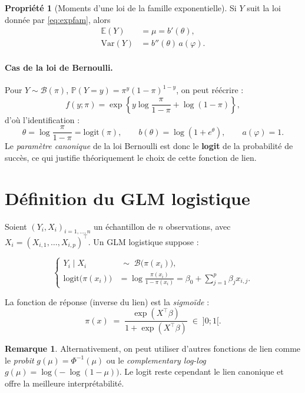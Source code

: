\documentclass[11pt,a4paper,twoside]{report}
\newcommand{\logit}{\mathrm{logit}}
\newcommand{\E}{\mathbb{E}}
\newcommand{\Var}{\mathrm{Var}}
\newcommand{\Prob}{\mathbb{P}}
\theoremstyle{definition}
\newtheorem{remarque}{Remarque}[chapter]
\newtheorem{propriete}{Propriété}[chapter]
\begin{document}
\begin{propriete}[Moments d'une loi de la famille exponentielle]
Si $Y$ suit la loi donnée par \eqref{eq:expfam}, alors
\begin{align}
  \E(Y)  &= \mu = b'(\theta), \\
  \Var(Y) &= b''(\theta)\, a(\varphi).
\end{align}
\end{propriete}

\paragraph{Cas de la loi de Bernoulli.}
Pour $Y \sim \mathcal{B}(\pi)$, $\Prob(Y=y) = \pi^y(1-\pi)^{1-y}$, on peut
réécrire :
\[
  f(y;\pi) = \exp\!\left\{ y\log\!\frac{\pi}{1-\pi} + \log(1-\pi)\right\},
\]
d'où l'identification :
\[
  \theta = \log\!\frac{\pi}{1-\pi} = \logit(\pi),\qquad
  b(\theta) = \log(1+e^\theta), \qquad a(\varphi)=1.
\]
Le \emph{paramètre canonique} de la loi Bernoulli est donc le
\textbf{logit} de la probabilité de succès, ce qui justifie
théoriquement le choix de cette fonction de lien.

\section{Définition du GLM logistique}

Soient $(Y_i, X_i)_{i=1,\ldots,n}$ un échantillon de $n$ observations,
avec $X_i = (X_{i,1},\ldots,X_{i,p})^\top$. Un GLM logistique suppose :

\begin{equation}
  \left\{
  \begin{aligned}
    Y_i \mid X_i &\;\sim\; \mathcal{B}\big(\pi(x_i)\big),\\
    \logit\big(\pi(x_i)\big) &= \log\frac{\pi(x_i)}{1-\pi(x_i)}
    = \beta_0 + \sum_{j=1}^p \beta_j x_{i,j}.
  \end{aligned}\right.
  \label{eq:glmlogit}
\end{equation}

La fonction de réponse (inverse du lien) est la \emph{sigmoïde} :
\begin{equation}
  \pi(x) \;=\; \frac{\exp(X^\top\beta)}{1+\exp(X^\top\beta)}
  \;\in\; ]0;1[.
\end{equation}

\begin{remarque}
Alternativement, on peut utiliser d'autres fonctions de lien comme le
\emph{probit} $g(\mu) = \Phi^{-1}(\mu)$ ou le \emph{complementary
log-log} $g(\mu) = \log\!\big(-\log(1-\mu)\big)$. Le logit reste
cependant le lien canonique et offre la meilleure interprétabilité.
\end{remarque}
\end{document}
